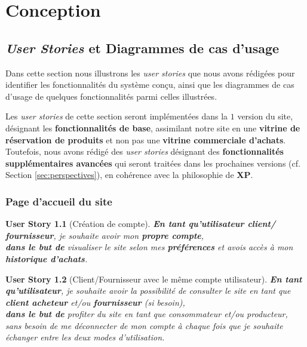 \documentclass[a4paper,12pt]{report}
\theoremstyle{break}
\newtheorem*{userStory}{User Story}
\theoremstyle{break}
\theoremstyle{break}
\theoremstyle{break}
\theoremstyle{definition}
\theoremstyle{remark}
\begin{document}
\chapter{Conception}
\section{\textit{User Stories} et Diagrammes de cas d'usage}
Dans cette section nous illustrons les \textit{user stories} que nous avons rédigées pour identifier les fonctionnalités du système conçu, ainsi que les diagrammes de cas d'usage de quelques fonctionnalités parmi celles illustrées.

Les \textit{user stories} de cette section seront implémentées dans la $1$\iere{} version du site, désignant les \textbf{fonctionnalités de base}, assimilant notre site en une \textbf{vitrine de réservation de produits} et non pas une \textbf{vitrine commerciale d'achats}. Toutefois, nous avons rédigé des \textit{user stories} désignant des \textbf{fonctionnalités supplémentaires avancées} qui seront traitées dans les prochaines versions (cf. Section \ref{sec:perspectives}), en cohérence avec la philosophie de \textbf{XP}.

\subsection{Page d'accueil du site}
\begin{userStory}[Création de compte]
\textbf{En tant qu'utilisateur {\color{green}client}/{\color{red} fournisseur}}, je souhaite avoir mon \textbf{propre compte},\\
\indent
\textbf{dans le but de} visualiser le site selon mes \textbf{préférences} et avois accès à mon \textbf{historique d'achats}.
\end{userStory}

\begin{userStory}[Client/Fournisseur avec le même compte utilisateur]
\textbf{En tant qu'utilisateur}, je souhaite avoir la possibilité de consulter le site en tant que \textbf{{\color{green}client acheteur}} et/ou \textbf{{\color{red} fournisseur}} (\textit{si besoin}),\\
\indent
\textbf{dans le but de} profiter du site en tant que consommateur et/ou producteur, sans besoin de me déconnecter de mon compte à chaque fois que je souhaite échanger entre les deux modes d'utilisation.
\end{userStory}
\end{document}
